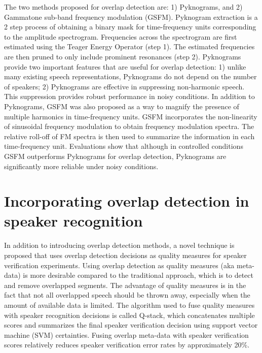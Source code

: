 The two methods proposed for overlap detection are: 1) Pyknograms, and 2) Gammatone sub-band frequency modulation (GSFM). 
Pyknogram extraction is a 2 step process of obtaining a binary mask for time-frequency units corresponding to the amplitude spectrogram. 
Frequencies across the spectrogram are first estimated using the Teager Energy Operator (step 1). 
The estimated frequencies are then pruned to only include prominent resonances (step 2). 
Pyknograms provide two important features that are useful for overlap detection: 1) unlike many existing speech representations, Pyknograms do not depend on the number of speakers; 2) Pyknograms are effective in suppressing non-harmonic speech. This suppression provides robust performance in noisy conditions. 
In addition to Pyknograms, GSFM was also proposed as a way to magnify the presence of multiple harmonics in time-frequency units. 
GSFM incorporates the non-linearity of sinusoidal frequency modulation to obtain frequency modulation spectra. 
The relative roll-off of FM spectra is then used to summarize the information in each time-frequency unit. 
Evaluations show that although in controlled conditions GSFM outperforms Pyknograms for overlap detection, Pyknograms are significantly more reliable under noisy conditions. 

\section{Incorporating overlap detection in speaker recognition}
In addition to introducing overlap detection methods, a novel technique is proposed that uses overlap detection decisions as quality measures for speaker verification experiments. 
Using overlap detection as quality measures (aka meta-data) is more desirable compared to the traditional approach, which is to detect and remove overlapped segments. 
The advantage of quality measures is in the fact that not all overlapped speech should be thrown away, especially when the amount of available data is limited. 
The algorithm used to fuse quality measures with speaker recognition decisions is called Q-stack, which concatenates multiple scores and summarizes the final speaker verification decision using support vector machine (SVM) certainties. 
Fusing overlap meta-data with speaker verification scores relatively reduces speaker verification error rates by approximately 20\%. 

